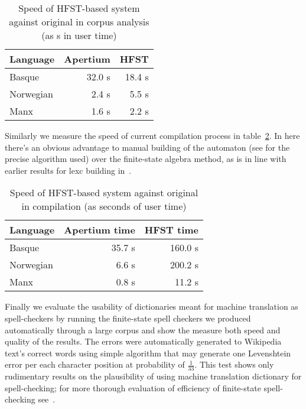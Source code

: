 \documentclass[10pt,a4paper]{article}
\begin{document}
\begin{table}[h]
\begin{center}
\begin{tabular}{|l|r|r|}
\hline
\bf Language & \bf Apertium & \bf HFST \\
\hline
Basque       & 32.0 s& 18.4 s \\
Norwegian    & 2.4 s & 5.5  s \\
Manx         & 1.6 s & 2.2  s \\
\hline
\end{tabular}
\caption{Speed of HFST-based system against original in corpus analysis
 (as s in user time)
\label{table:speed}}
\end{center}
\end{table}

Similarly we measure the speed of current compilation process in 
table~\ref{table:compile-speed}. In here there's an obvious advantage to
manual building of the automaton (see \cite{rojas2005} for the precise algorithm
used) over the finite-state algebra method, as is
in line with earlier results for lexc building in~\cite{pirinen/2009/sfcm}.

\begin{table}[h]
\begin{center}
\begin{tabular}{|l|r|r|}
\hline
\bf Language & \bf Apertium time & \bf HFST time \\
\hline
Basque       & 35.7 s & 160.0  s \\
Norwegian    & 6.6 s  & 200.2 s \\
Manx         & 0.8 s  & 11.2  s \\
\hline
\end{tabular}
\caption{Speed of HFST-based system against original in compilation
 (as seconds of user time)
\label{table:compile-speed}}
\end{center}
\end{table}

Finally we evaluate the usability of dictionaries meant for machine translation
as spell-checkers by running the finite-state spell checkers we produced
automatically through a large corpus and show the measure both speed and
quality of the results. The errors were automatically generated to Wikipedia
text's correct words using simple algorithm that may generate one Levenshtein
error per each character position at probability of $\frac{1}{33}$.  This test
shows only rudimentary results on the plausibility of using machine translation
dictionary for spell-checking; for more thorough evaluation of efficiency of
finite-state spell-checking see~\cite{hassan/2008}.
\end{document}
